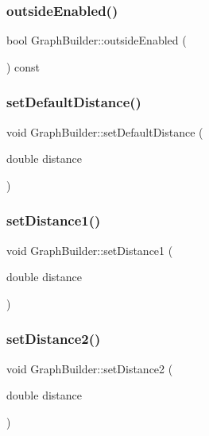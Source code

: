 \subsubsection{\texorpdfstring{outsideEnabled()}{outsideEnabled()}}
{\footnotesize\ttfamily bool Graph\+Builder\+::outside\+Enabled (\begin{DoxyParamCaption}{ }\end{DoxyParamCaption}) const}

\mbox{\label{class_graph_builder_a19e3a9bea0d7ce5a652282e91959dd19}} 
\subsubsection{\texorpdfstring{setDefaultDistance()}{setDefaultDistance()}}
{\footnotesize\ttfamily void Graph\+Builder\+::set\+Default\+Distance (\begin{DoxyParamCaption}\item[{double}]{distance }\end{DoxyParamCaption})\hspace{0.3cm}{\ttfamily [inline]}}

\mbox{\label{class_graph_builder_a5d2fca10989ba993e67a41a0ee5c05e5}} 
\subsubsection{\texorpdfstring{setDistance1()}{setDistance1()}}
{\footnotesize\ttfamily void Graph\+Builder\+::set\+Distance1 (\begin{DoxyParamCaption}\item[{double}]{distance }\end{DoxyParamCaption})\hspace{0.3cm}{\ttfamily [inline]}}

\mbox{\label{class_graph_builder_a327ec74b0d914e47990ab9b648da360f}} 
\subsubsection{\texorpdfstring{setDistance2()}{setDistance2()}}
{\footnotesize\ttfamily void Graph\+Builder\+::set\+Distance2 (\begin{DoxyParamCaption}\item[{double}]{distance }\end{DoxyParamCaption})\hspace{0.3cm}{\ttfamily [inline]}}

